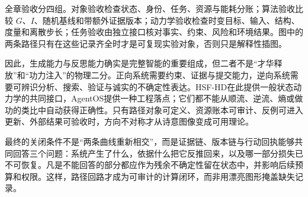 全章验收分四组。对象验收检查状态、身份、任务、资源与能耗分账；算法验收比较 $G$、$I$、随机基线和带额外证据版本；动力学验收检查时变目标、输入、结构、度量和离散步长；任务验收由独立接口核对事实、约束、风险和环境结果。图中的两条路径只有在这些记录齐全时才是可复现实验对象，否则只是解释性插图。

因此，生成能力与反思能力确实是完整智能的重要组成，但二者不是“才华释放”和“功力注入”的物理二分。正向系统需要约束、证据与提交能力，逆向系统需要可辨识分析、搜索、验证与诚实的不确定性表达。HSF-HD在此提供一般状态动力学的共同接口，AgentOS提供一种工程落点；它们都不能从顺流、逆流、熵或做功的类比中自动获得正确性。只有路径对象可定义、资源账本可审计、反例可进入更新、外部结果可验收时，方向不对称才从诗意图像变成可用理论。

最终的关闭条件不是“两条曲线重新相交”，而是证据链、版本链与行动回执能够共同回答三个问题：系统产生了什么，依据什么把它反推回来，以及哪一部分损失已不可恢复。凡是不能回答的部分都应作为残余不确定性留在状态中，并影响后续预算和权限。这样，路径回路才成为可审计的计算闭环，而非用漂亮图形掩盖缺失记录。
